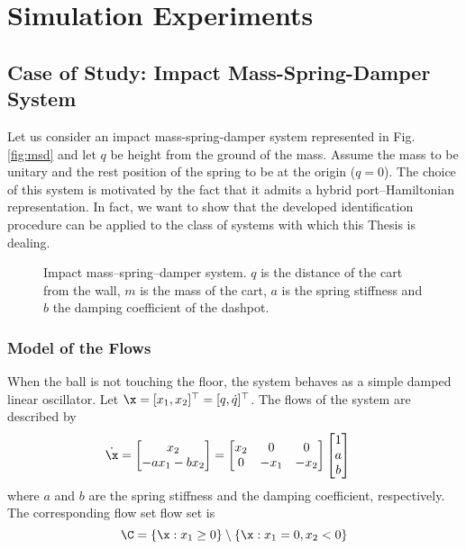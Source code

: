 \clearpage
\section{Simulation Experiments}\label{Experiments}
\subsection{Case of Study: Impact Mass-Spring-Damper System}
Let us consider an impact mass-spring-damper system represented in Fig. \ref{fig:msd} and let $q$ be height from the ground of the mass. Assume the mass to be unitary and the rest position of the spring to be at the origin ($q=0$). The choice of this system is motivated by the fact that it admits a hybrid port--Hamiltonian representation. In fact, we want to show that the developed identification procedure can be applied to the class of systems with which this Thesis is dealing.
%
\begin{figure}[!b]
	\centering
	
    \caption[Impact mass--spring--damper system.]{Impact mass--spring--damper system. $q$ is the distance of the cart from the wall, $m$ is the mass of the cart, $a$ is the spring stiffness and $b$ the damping coefficient of the dashpot.} 
    \label{fig:imsd}
\end{figure}
%
\subsubsection{Model of the Flows}
%
When the ball is not touching the floor, the system behaves as a simple damped linear oscillator. Let $\x = [x_1,x_2]^\top = [q,\dot{q}]^\top$. The flows of the system are described by 
\begin{align}
	\dot{\x}&=\begin{bmatrix}x_2\\-ax_1-bx_2\end{bmatrix}
	=\begin{bmatrix}x_2&0&0\\0&-x_1&-x_2\end{bmatrix}\begin{bmatrix}1\\a\\b\end{bmatrix}
\end{align}
%
{where $a$ and $b$ are the spring stiffness and the damping coefficient, respectively}. The corresponding flow set flow set is
%
\begin{equation}
    \C = \{\x:x_1\geq0\}\setminus\{\x:x_1=0,x_2<0\}
\end{equation}
%
